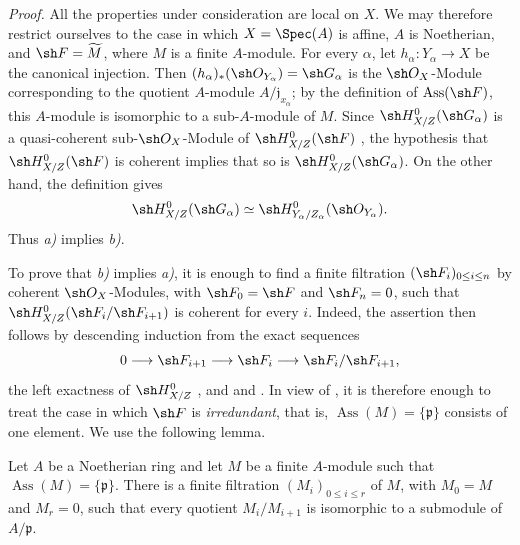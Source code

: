 \noindent\emph{Proof.}\quad
All the properties under consideration are local on $X$.  We may
therefore restrict ourselves to the case in which
$X=\Spec(A)$ is affine, $A$ is Noetherian, and
$\sh F=\widetilde M$, where $M$ is a finite $A$-module.  For
every $\alpha$, let $h_\alpha:Y_\alpha\to X$ be the canonical
injection.  Then $(h_\alpha)_*(\sh O_{Y_\alpha})=\sh G_\alpha$
is the $\sh O_X$-Module corresponding to the quotient $A$-module
$A/\mathfrak j_{x_\alpha}$; by the definition of
$\operatorname{Ass}(\sh F)$, this $A$-module is isomorphic to a
sub-$A$-module of $M$.  Since
$\sh H^0_{X/Z}(\sh G_\alpha)$ is a quasi-coherent
sub-$\sh O_X$-Module of $\sh H^0_{X/Z}(\sh F)$
, the hypothesis that $\sh H^0_{X/Z}(\sh F)$ is coherent
implies that so is $\sh H^0_{X/Z}(\sh G_\alpha)$.
On the other hand, the definition  gives
\[
  \sh H^0_{X/Z}(\sh G_\alpha)
  \simeq
  \sh H^0_{Y_\alpha/Z_\alpha}(\sh O_{Y_\alpha}).
\]
Thus \emph{a)} implies \emph{b)}.

To prove that \emph{b)} implies \emph{a)}, it is enough to find a finite filtration
$(\sh F_i)_{0\leq i\leq n}$ by coherent $\sh O_X$-Modules, with
$\sh F_0=\sh F$ and $\sh F_n=0$, such that $\sh H^0_{X/Z}(\sh F_i/\sh F_{i+1})$
is coherent for every $i$.  Indeed, the assertion then follows by
descending induction from the exact sequences
\[
  0\longrightarrow\sh F_{i+1}\longrightarrow\sh F_i
  \longrightarrow\sh F_i/\sh F_{i+1},
\]
the left exactness of $\sh H^0_{X/Z}$ , and
 and .  In view of
, it is therefore enough to treat the case in which
$\sh F$ is \emph{irredundant}, that is,
$\operatorname{Ass}(M)=\{\mathfrak p\}$ consists of one element.
We use the following lemma.

\begin{lemma}[5.11.1.1]
\label{IV.5.11.1.1}
Let $A$ be a Noetherian ring and let $M$ be a finite $A$-module
such that $\operatorname{Ass}(M)=\{\mathfrak p\}$.  There is a
finite filtration $(M_i)_{0\leq i\leq r}$ of $M$, with
$M_0=M$ and $M_r=0$, such that every quotient
$M_i/M_{i+1}$ is isomorphic to a submodule of $A/\mathfrak p$.
\end{lemma}

